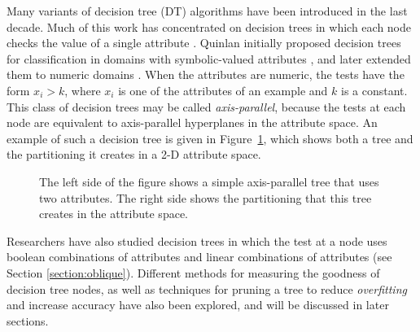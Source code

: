 Many variants of decision tree (DT) algorithms have been introduced in
the last decade.  Much of this work has concentrated on decision trees
in which each node checks the value of a single attribute
\cite{breiman/etal/84,quinlan/86,quinlan/93}.  Quinlan initially
proposed decision trees for classification in domains with
symbolic-valued attributes
\citeyear{quinlan/86}, and later extended them to numeric domains
\citeyear{quinlan/87b}.  When the attributes are numeric, the tests 
have the form $x_i > k$, where $x_i$ is one of the attributes of an
example and $k$ is a constant.  This class of decision trees may be
called {\it axis-parallel}, because the tests at each node are
equivalent to axis-parallel hyperplanes in the attribute space.  An
example of such a decision tree is given in
Figure~\ref{figure:aptree}, which shows both a tree and the
partitioning it creates in a 2-D attribute space.

\begin{figure}
\vspace{2.0in}
\caption{The left side of the figure shows a simple axis-parallel tree 
that uses two attributes.  The right side shows the partitioning
that this tree creates in the attribute space.}
\label{figure:aptree}
\vspace*{-.2in} 
\end{figure}

Researchers have also studied decision trees in which the test at a
node uses boolean combinations of attributes
\cite{pagallo/90,pagallo/haussler/90,sahami/93} and linear combinations
of attributes (see Section \ref{section:oblique}).  Different methods
for measuring the goodness of decision tree nodes, as well as
techniques for pruning a tree to reduce {\it overfitting} and increase
accuracy have also been explored, and will be discussed in later
sections.

